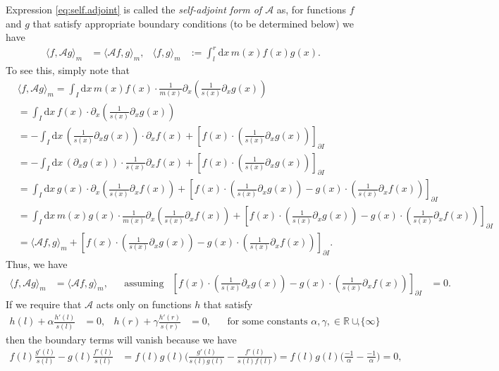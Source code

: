 \documentclass[12pt]{book}
\numberwithin{equation}{chapter}
\theoremstyle{plain}
\numberwithin{theorem}{section}
\theoremstyle{definition}
\numberwithin{exercise}{chapter}
\newcommand{\<}{\langle}
\renewcommand{\>}{\rangle}
\renewcommand{\(}{\left(}
\renewcommand{\)}{\right)}
\renewcommand{\[}{\left[}
\renewcommand{\]}{\right]}
\newcommand\Rb{\mathds{R}}
\newcommand\Ac{\mathscr{A}}
\newcommand\gam{\gamma}
\newcommand\del{\delta}
\renewcommand\d{\partial}
\newcommand\dd{\mathrm{d}}
\begin{document}
\noindent
Expression \eqref{eq:self.adjoint} is called the \emph{self-adjoint form of $\Ac$} as, for functions $f$ and $g$ that satisfy appropriate boundary conditions (to be determined below) we have
\begin{align}
\< f , \Ac g \>_m
	&=	\< \Ac f, g \>_m , &
\< f, g \>_m
	&:=	\int_l^r \dd x \, m(x) f(x) g(x) .
\end{align}
To see this, simply note that
\begin{align}
&\< f , \Ac g \>_m
	=	\int_I \dd x \, m(x) f(x) \cdot \frac{1}{m(x)} \d_x \( \frac{1}{s(x)} \d_x g(x) \) \\
	&=	\int_I \dd x \, f(x) \cdot \d_x \( \frac{1}{s(x)} \d_x g(x) \) \\
	&=	- \int_I \dd x \, \( \frac{1}{s(x)} \d_x g(x) \) \cdot \d_x f(x) 
				+ \[ f(x) \cdot \( \frac{1}{s(x)} \d_x g(x) \) \]_{\d I} \\
	&=	- \int_I \dd x \, \( \d_x g(x) \) \cdot  \frac{1}{s(x)} \d_x f(x) 
				+ \[ f(x) \cdot \( \frac{1}{s(x)} \d_x g(x) \) \]_{\d I} \\
	&=	\int_I \dd x \, g(x) \cdot \d_x \( \frac{1}{s(x)} \d_x f(x) \)  
				+ \[ f(x) \cdot \( \frac{1}{s(x)} \d_x g(x) \) - g(x) \cdot \( \frac{1}{s(x)} \d_x f(x) \) \]_{\d I} \\ 
	&=	\int_I \dd x \, m(x) g(x) \cdot \frac{1}{m(x)} \d_x \( \frac{1}{s(x)} \d_x f(x) \) 
				+ \[ f(x) \cdot \( \frac{1}{s(x)} \d_x g(x) \) - g(x) \cdot \( \frac{1}{s(x)} \d_x f(x) \) \]_{\d I} \\
	&=	\< \Ac f, g \>_m 
				+ \[ f(x) \cdot \( \frac{1}{s(x)} \d_x g(x) \) - g(x) \cdot \( \frac{1}{s(x)} \d_x f(x) \) \]_{\d I} .
\end{align}
Thus, we have
\begin{align}
\< f , \Ac g \>_m
	&=	\< \Ac f , g \>_m , &
	&\text{assuming}&
\[ f(x) \cdot \( \frac{1}{s(x)} \d_x g(x) \) - g(x) \cdot \( \frac{1}{s(x)} \d_x f(x) \) \]_{\d I}
	&=	0 .
\end{align}
If we require that $\Ac$ acts only on functions $h$ that satisfy
\begin{align}
h(l) + \alpha \frac{h'(l)}{s(l)} 
	&=	0 , &
h(r) + \gam \frac{h'(r)}{s(r)} 
	&=	0 , &
	&\text{for some constants $\alpha, \gam, \in \Rb \cup \{ \infty \} $}, \label{eq:bcs-h}
\end{align}
then the boundary terms will vanish because we have
\begin{align}
f(l)\frac{g'(l)}{s(l)} - g(l) \frac{f'(l)}{s(l)}
	&=	f(l)g(l) \Big( \frac{g'(l)}{s(l)g(l)} - \frac{f'(l)}{s(l)f(l)} \Big)
	=		f(l)g(l)  \Big( \frac{-1}{\alpha} - \frac{-1}{\alpha} \Big) 
	= 	0 ,
\end{align}
\end{document}
